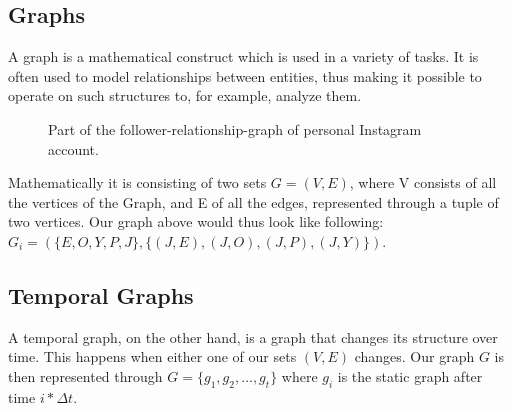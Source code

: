 \documentclass[sigconf]{acmart}
\begin{document}
\subsection{Graphs}
A graph is a mathematical construct which is used in a variety of tasks. It is often used to model relationships between 
entities, thus making it possible to operate on such structures to, for example, analyze them.\\
\begin{figure}[h]
  \begin{center}
\end{center}
\caption{Part of the follower-relationship-graph of personal Instagram account.}
\end{figure}
 Mathematically it is consisting of two sets \(G = (V, E)\), where V consists of all the vertices of the Graph, and E of all the edges, represented through a tuple of two vertices.
 Our graph above would thus look like following: \\
 \( G_i = (\{E,O,Y,P,J\}, \{(J,E),(J,O), (J,P), (J,Y)\}) \).

\subsection{Temporal Graphs}
A temporal graph, on the other hand, is a graph that changes its structure over time. This happens when either one of our sets \((V,E)\) changes. %
Our graph \(G\) is then represented through \(G = \{g_1, g_2, \ldots, g_t\}\) where \(g_i\) is the static graph after time \(i*\Delta t\).
\cite{temporalGraphs}
\end{document}

